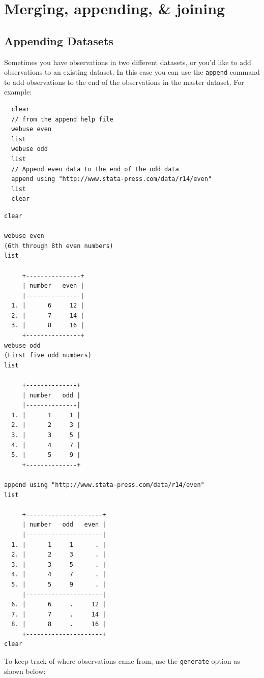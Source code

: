 \documentclass[]{book}
\begin{document}
\hypertarget{merging-appending-joining}{%
\section{Merging, appending, \& joining}\label{merging-appending-joining}}

\hypertarget{appending-datasets}{%
\subsection{Appending Datasets}\label{appending-datasets}}

Sometimes you have observations in two different datasets, or you'd like to add observations to an existing dataset. In this case you can use the \texttt{append} command to add observations to the end of the observations in the master dataset. For example:

\begin{verbatim}
  clear
  // from the append help file
  webuse even
  list
  webuse odd
  list
  // Append even data to the end of the odd data
  append using "http://www.stata-press.com/data/r14/even"
  list
  clear
\end{verbatim}

\begin{verbatim}
clear

webuse even
(6th through 8th even numbers)
list

     +---------------+
     | number   even |
     |---------------|
  1. |      6     12 |
  2. |      7     14 |
  3. |      8     16 |
     +---------------+
webuse odd
(First five odd numbers)
list

     +--------------+
     | number   odd |
     |--------------|
  1. |      1     1 |
  2. |      2     3 |
  3. |      3     5 |
  4. |      4     7 |
  5. |      5     9 |
     +--------------+

append using "http://www.stata-press.com/data/r14/even"
list

     +---------------------+
     | number   odd   even |
     |---------------------|
  1. |      1     1      . |
  2. |      2     3      . |
  3. |      3     5      . |
  4. |      4     7      . |
  5. |      5     9      . |
     |---------------------|
  6. |      6     .     12 |
  7. |      7     .     14 |
  8. |      8     .     16 |
     +---------------------+
clear
\end{verbatim}

To keep track of where observations came from, use the \texttt{generate} option as shown below:
\end{document}
